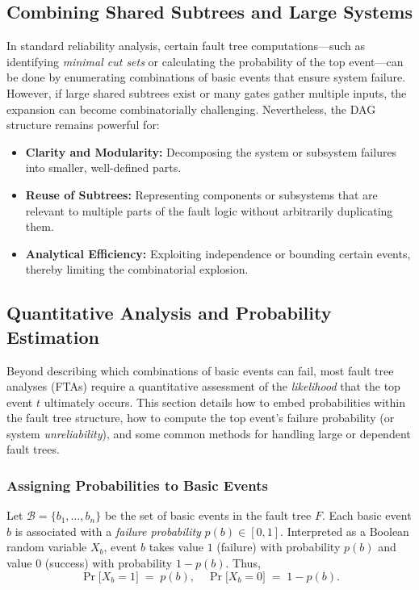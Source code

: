 \subsection{Combining Shared Subtrees and Large Systems}

In standard reliability analysis, certain fault tree computations—such as identifying \emph{minimal cut sets} or calculating the probability of the top event—can be done by enumerating combinations of basic events that ensure system failure. However, if large shared subtrees exist or many gates gather multiple inputs, the expansion can become combinatorially challenging. Nevertheless, the DAG structure remains powerful for:

\begin{itemize}
\item \textbf{Clarity and Modularity:} Decomposing the system or subsystem failures into smaller, well-defined parts.  
\item \textbf{Reuse of Subtrees:} Representing components or subsystems that are relevant to multiple parts of the fault logic without arbitrarily duplicating them.  
\item \textbf{Analytical Efficiency:} Exploiting independence or bounding certain events, thereby limiting the combinatorial explosion.  
\end{itemize}

\subsection{Quantitative Analysis and Probability Estimation}
\label{sec:fault_tree_probability_estimation}

Beyond describing which combinations of basic events can fail, most fault tree analyses (FTAs) require a quantitative assessment of the \emph{likelihood} that the top event \(t\) ultimately occurs. This section details how to embed probabilities within the fault tree structure, how to compute the top event’s failure probability (or system \emph{unreliability}), and some common methods for handling large or dependent fault trees.

\subsubsection{Assigning Probabilities to Basic Events}

Let \(\mathcal{B}=\{b_1, \dots, b_n\}\) be the set of basic events in the fault tree \(F\).  Each basic event \(b\) is associated with a \emph{failure probability} \(p(b)\in [0,1]\).  Interpreted as a Boolean random variable \(X_b\), event \(b\) takes value \(1\) (failure) with probability \(p(b)\) and value \(0\) (success) with probability \(1-p(b)\).  Thus, 
\[
\Pr\bigl[X_b = 1\bigr] \;=\; p(b), 
\quad
\Pr\bigl[X_b = 0\bigr] \;=\; 1-p(b).
\]

